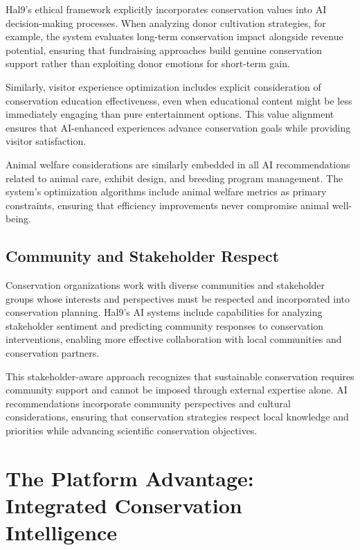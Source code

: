 \documentclass[
  Letterpaper,
]{scrbook}
\begin{document}
Hal9's ethical framework explicitly incorporates conservation values
into AI decision-making processes. When analyzing donor cultivation
strategies, for example, the system evaluates long-term conservation
impact alongside revenue potential, ensuring that fundraising approaches
build genuine conservation support rather than exploiting donor emotions
for short-term gain.

Similarly, visitor experience optimization includes explicit
consideration of conservation education effectiveness, even when
educational content might be less immediately engaging than pure
entertainment options. This value alignment ensures that AI-enhanced
experiences advance conservation goals while providing visitor
satisfaction.

Animal welfare considerations are similarly embedded in all AI
recommendations related to animal care, exhibit design, and breeding
program management. The system's optimization algorithms include animal
welfare metrics as primary constraints, ensuring that efficiency
improvements never compromise animal well-being.

\subsection{Community and Stakeholder
Respect}\label{community-and-stakeholder-respect}

Conservation organizations work with diverse communities and stakeholder
groups whose interests and perspectives must be respected and
incorporated into conservation planning. Hal9's AI systems include
capabilities for analyzing stakeholder sentiment and predicting
community responses to conservation interventions, enabling more
effective collaboration with local communities and conservation
partners.

This stakeholder-aware approach recognizes that sustainable conservation
requires community support and cannot be imposed through external
expertise alone. AI recommendations incorporate community perspectives
and cultural considerations, ensuring that conservation strategies
respect local knowledge and priorities while advancing scientific
conservation objectives.

\section{The Platform Advantage: Integrated Conservation
Intelligence}\label{the-platform-advantage-integrated-conservation-intelligence}
\end{document}
